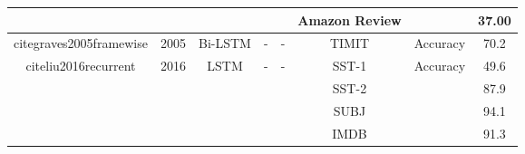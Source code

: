 \documentclass[12pt, a4paper, oneside]{report}
\begin{document}
\begin{tabular}{|c|c|c|c|c|c|cc|}
                                                                          &                       &                                   &                                         &                                                                                                        & Amazon Review                         & \multicolumn{1}{c|}{}                                                                                                              & 37.00  \\ \hline
    cite{graves2005framewise}                           & 2005                  & Bi-LSTM                           & -                                       & -                                                                                                      & TIMIT                                 & \multicolumn{1}{c|}{Accuracy}                                                                                                      & 70.2   \\ \hline
    \multirow{4}{*}{cite{liu2016recurrent}}             & \multirow{4}{*}{2016} & \multirow{4}{*}{LSTM}             & \multirow{4}{*}{-}                      & \multirow{4}{*}{-}                                                                                     & SST-1                                 & \multicolumn{1}{c|}{\multirow{4}{*}{Accuracy}}                                                                                     & 49.6   \\ \cline{6-6} \cline{8-8} 
                                                                          &                       &                                   &                                         &                                                                                                        & SST-2                                 & \multicolumn{1}{c|}{}                                                                                                              & 87.9   \\ \cline{6-6} \cline{8-8} 
                                                                          &                       &                                   &                                         &                                                                                                        & SUBJ                                  & \multicolumn{1}{c|}{}                                                                                                              & 94.1   \\ \cline{6-6} \cline{8-8} 
                                                                          &                       &                                   &                                         &                                                                                                        & IMDB                                  & \multicolumn{1}{c|}{}                                                                                                              & 91.3   \\ \hline

\end{tabular}
\end{document}
